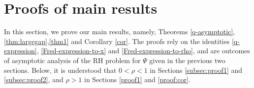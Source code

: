\documentclass[11pt,a4paper]{article}
\numberwithin{equation}{section}
\begin{document}

\section{Proofs of main results}
\label{proof-largegap}
In this section, we prove our main results, namely, Theorems \ref{q-asymptotic}, \ref{thm:largegap},\ref{thm1} and Corollary \ref{cor}. The proofs rely on the identities \eqref{q-expression}, \eqref{Fred-expression-to-x} and \eqref{Fred-expression-to-rho}, and are outcomes of asymptotic analysis of the RH problem for $\Psi$ given in the previous two sections. Below, it is understood that $0<\rho<1$ in Sections \ref{subsec:proof1} and \ref{subsec:proof2}, and $\rho>1$ in Sections \ref{proof1} and \ref{proof:cor}.
\end{document}

